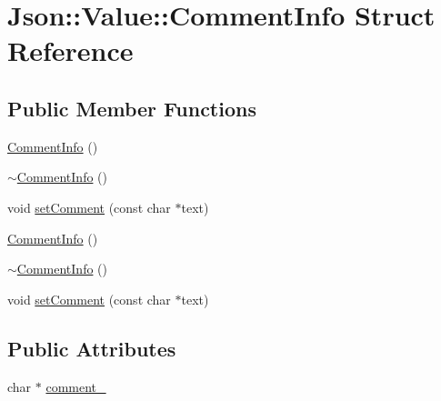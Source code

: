 \hypertarget{structJson_1_1Value_1_1CommentInfo}{\section{Json\-:\-:Value\-:\-:Comment\-Info Struct Reference}
\label{d9/d32/structJson_1_1Value_1_1CommentInfo}
}
\subsection*{Public Member Functions}
\begin{DoxyCompactItemize}
\item 
\hyperlink{structJson_1_1Value_1_1CommentInfo_ab23b0c125695d284bded2fb106a49043}{Comment\-Info} ()
\item 
\hyperlink{structJson_1_1Value_1_1CommentInfo_ab4d0877190bdbf484e4e2a3bade42ac8}{$\sim$\-Comment\-Info} ()
\item 
void \hyperlink{structJson_1_1Value_1_1CommentInfo_a7ee273d42f033e237e15017dcee1bcc5}{set\-Comment} (const char $\ast$text)
\item 
\hyperlink{structJson_1_1Value_1_1CommentInfo_ab23b0c125695d284bded2fb106a49043}{Comment\-Info} ()
\item 
\hyperlink{structJson_1_1Value_1_1CommentInfo_ab4d0877190bdbf484e4e2a3bade42ac8}{$\sim$\-Comment\-Info} ()
\item 
void \hyperlink{structJson_1_1Value_1_1CommentInfo_a7ee273d42f033e237e15017dcee1bcc5}{set\-Comment} (const char $\ast$text)
\end{DoxyCompactItemize}
\subsection*{Public Attributes}
\begin{DoxyCompactItemize}
\item 
char $\ast$ \hyperlink{structJson_1_1Value_1_1CommentInfo_ac80f716e6784d896c84809f529b17d65}{comment\-\_\-}
\end{DoxyCompactItemize}


